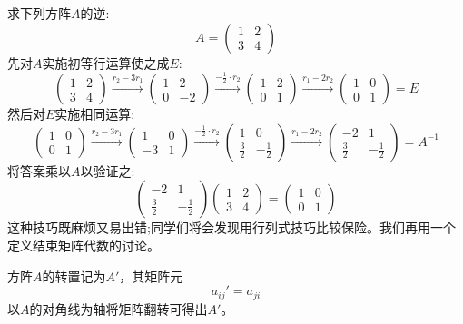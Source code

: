 求下列方阵$A$的逆:
\[A=
\begin{pmatrix}
    1 & 2 \\
    3 & 4
\end{pmatrix} 
\]
先对$A$实施初等行运算使之成$E$:
\[
\begin{pmatrix}
    1 & 2 \\
    3 & 4
\end{pmatrix}    
\xrightarrow{r_2-3r_1}
\begin{pmatrix}
    1 & 2 \\
    0 & -2
\end{pmatrix} 
\xrightarrow{-\frac{1}{2} \cdot r_2}
\begin{pmatrix}
    1 & 2 \\
    0 & 1
\end{pmatrix} 
\xrightarrow{r_1-2r_2}
\begin{pmatrix}
    1 & 0 \\
    0 & 1
\end{pmatrix} 
=E
\]
然后对$E$实施相同运算:
\[
\begin{pmatrix}
    1 & 0 \\
    0 & 1
\end{pmatrix}
\xrightarrow{r_2-3r_1}
\begin{pmatrix}
    1 & 0 \\
    -3 & 1
\end{pmatrix}
\xrightarrow{-\frac{1}{2} \cdot r_2}
\begin{pmatrix}
    1 & 0 \\
    \frac{3}{2} & -\frac{1}{2}
\end{pmatrix}
\xrightarrow{r_1-2r_2}
\begin{pmatrix}
    -2 & 1 \\
    \frac{3}{2} & -\frac{1}{2}
\end{pmatrix}
=A^{-1}
\]
将答案乘以$A$以验证之:
\[
\begin{pmatrix}
    -2 & 1 \\
    \frac{3}{2} & -\frac{1}{2}
\end{pmatrix}   
\begin{pmatrix}
    1 & 2 \\
    3 & 4
\end{pmatrix} 
=
\begin{pmatrix}
    1 & 0 \\
    0 & 1
\end{pmatrix} 
\]
这种技巧既麻烦又易出错;同学们将会发现用行列式技巧比较保险。我们再用一个定义结束矩阵代数的讨论。

\begin{definition}[矩阵转置]
    方阵$A$的转置记为$A'$，其矩阵元
    \[a_{ij}'=a_{ji}\]
    以$A$的对角线为轴将矩阵翻转可得出$A'$。
\end{definition}

